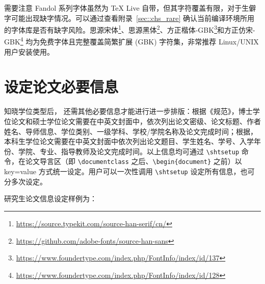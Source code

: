 \documentclass[master]{shtthesis}
\begin{document}
需要注意 Fandol 系列字体虽然为 \TeX{} Live 自带，但其字符覆盖有限，对于生僻字可能出现缺字情况。可以通过查看附录~\ref{sec::chs_rare} 确认当前编译环境所用的字体库是否有缺字风险。思源宋体\footnote{\url{https://source.typekit.com/source-han-serif/cn/}}、思源黑体\footnote{\url{https://github.com/adobe-fonts/source-han-sans}}、方正楷体-GBK\footnote{\url{https://www.foundertype.com/index.php/FontInfo/index/id/137}}和方正仿宋-GBK\footnote{\url{https://www.foundertype.com/index.php/FontInfo/index/id/128}} 均为免费字体且完整覆盖简繁扩展 (GBK) 字符集，非常推荐 Linux/UNIX 用户安装使用。

\section{设定论文必要信息} \label{sec::setup_info}
知晓学位类型后，\shtthesis{} 还需其他必要信息才能进行进一步排版：根据《规范》，博士学位论文和硕士学位论文需要在中英文封面中，依次列出论文密级、论文标题、作者姓名、导师信息、学位类别、一级学科、学校/学院名称及论文完成时间；根据\citet{bachelor2019}，本科生学位论文需要在中英文封面中依次列出论文题目、学生姓名、学号、入学年份、学院、专业、指导教师及论文完成时间。以上信息均可通过 \verb|\shtsetup| 命令，在论文导言区（即 \verb|\documentclass| 之后、\verb|\begin{document}| 之前）以 key=value 方式统一设定。用户可以一次性调用 \verb|\shtsetup| 设定所有信息，也可分多次设定。

研究生论文信息设定样例为：
\begin{latex}
\end{latex}
\end{document}
